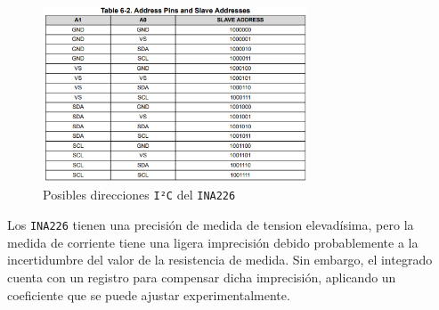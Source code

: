 \begin{figure}[H]
    \centering
    \includegraphics[width=0.7\textwidth]{images/2-hardware/componentes/direcciones_ina.png}
    \caption{Posibles direcciones \texttt{I²C} del \texttt{INA226}}
    \label{fig:hardware/modulos/direcciones_ina}
\end{figure}

Los \texttt{INA226} tienen una precisión de medida de tension elevadísima, pero la medida de corriente tiene una ligera imprecisión debido probablemente a la incertidumbre del valor de la resistencia de medida. Sin embargo, el integrado cuenta con un registro para compensar dicha imprecisión, aplicando un coeficiente que se puede ajustar experimentalmente.